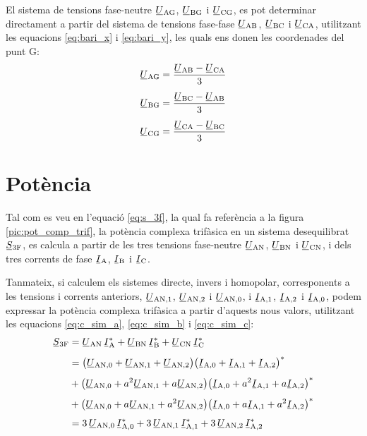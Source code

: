 El sistema de tensions fase-neutre
$\cmplx{U}\ped{AG}$, $\cmplx{U}\ped{BG}$ i $\cmplx{U}\ped{CG}$, es pot determinar directament a partir del sistema de tensions fase-fase $\cmplx{U}\ped{AB}$, $\cmplx{U}\ped{BC}$ i $\cmplx{U}\ped{CA}$, utilitzant les equacions \eqref{eq:bari_x} i \eqref{eq:bari_y}, les quals ens donen les coordenades del punt G:
\begin{subequations}
\begin{align}
    \cmplx{U}\ped{AG} &= \frac{\cmplx{U}\ped{AB}-\cmplx{U}\ped{CA}}{3}\label{eq:uag}\\[1ex]
    \cmplx{U}\ped{BG} &= \frac{\cmplx{U}\ped{BC}-\cmplx{U}\ped{AB}}{3}\label{eq:ubg}\\[1ex]
    \cmplx{U}\ped{CG} &= \frac{\cmplx{U}\ped{CA}-\cmplx{U}\ped{BC}}{3}\label{eq:ucg}
\end{align}
\end{subequations}

\section{Potència} 

Tal com es veu en l'equació \eqref{eq:s_3f}, la qual fa referència a
la figura \vref{pic:pot_comp_trif}, la potència complexa trifàsica
en un sistema desequilibrat $\cmplx{S}\ped{3F}$, es calcula a partir
de les tres tensions fase-neutre $\cmplx{U}\ped{AN}$,
$\cmplx{U}\ped{BN}$ i $\cmplx{U}\ped{CN}$, i dels tres
corrents de fase $\cmplx{I}\ped{A}$, $\cmplx{I}\ped{B}$ i
$\cmplx{I}\ped{C}$.


Tanmateix, si calculem els sistemes directe, invers i homopolar,
corresponents a les tensions i corrents anteriors,
$\cmplx{U}\ped{AN,1}$, $\cmplx{U}\ped{AN,2}$ i
$\cmplx{U}\ped{AN,0}$, i $\cmplx{I}\ped{A,1}$,
$\cmplx{I}\ped{A,2}$ i $\cmplx{I}\ped{A,0}$, podem
expressar la potència complexa trifàsica a partir d'aquests nous
valors, utilitzant les equacions \eqref{eq:c_sim_a},
\eqref{eq:c_sim_b} i \eqref{eq:c_sim_c}:
\begin{equation}
\begin{split}
   \cmplx{S}\ped{3F} &= \cmplx{U}\ped{AN} \,\cmplx{I}\ped{A}^* +
   \cmplx{U}\ped{BN} \,\cmplx{I}\ped{B}^* +  \cmplx{U}\ped{CN} \,\cmplx{I}\ped{C}^*  \\[1ex]
   &= \big(\cmplx{U}\ped{AN,0} + \cmplx{U}\ped{AN,1} +
   \cmplx{U}\ped{AN,2}\big) \big(\cmplx{I}\ped{A,0} + \cmplx{I}\ped{A,1} +
   \cmplx{I}\ped{A,2}\big)^*   \\[1ex]
   &+ \big(\cmplx{U}\ped{AN,0} + a^2 \cmplx{U}\ped{AN,1} +
   a \cmplx{U}\ped{AN,2} \big) \big(\cmplx{I}\ped{A,0} + a^2 \cmplx{I}\ped{A,1}
    + a \cmplx{I}\ped{A,2} \big)^*  \\[1ex]
   &+ \big(\cmplx{U}\ped{AN,0} + a \cmplx{U}\ped{AN,1} + a^2
   \cmplx{U}\ped{AN,2} \big) \big(\cmplx{I}\ped{A,0} + a
   \cmplx{I}\ped{A,1} + a^2 \cmplx{I}\ped{A,2} \big)^*   \\[1ex]
   &= 3\, \cmplx{U}\ped{AN,0} \, \cmplx{I}\ped{A,0}^* +
      3\, \cmplx{U}\ped{AN,1} \, \cmplx{I}\ped{A,1}^* +
      3\, \cmplx{U}\ped{AN,2}\,  \cmplx{I}\ped{A,2}^*
    \label{eq:c_sim_s}
\end{split}
\end{equation}


